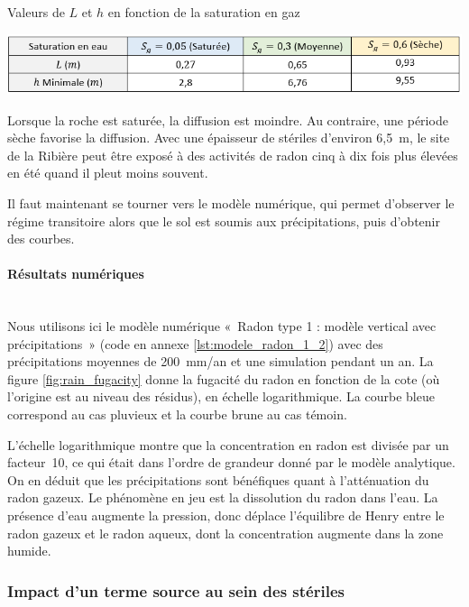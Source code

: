 \documentclass{article}
\begin{document}
\begin{table}[H]
    \centering
    \caption{Valeurs de $L$ et $h$ en fonction de la saturation en gaz}
    \includegraphics[width = \linewidth]{III_C_4.png}

    \label{tab:tableau_saturation}
\end{table}

Lorsque la roche est saturée, la diffusion est moindre. Au contraire, une période sèche favorise la diffusion. Avec une épaisseur de stériles d'environ 6,5~m, le site de la Ribière peut être exposé à des activités de radon cinq à dix fois plus élevées en été quand il pleut moins souvent.

Il faut maintenant se tourner vers le modèle numérique, qui permet d’observer le régime transitoire alors que le sol est soumis aux précipitations, puis d'obtenir des courbes.

\paragraph{Résultats numériques \\ \\}
Nous utilisons ici le modèle numérique « Radon type 1 : modèle vertical avec précipitations » (code en annexe \ref{lst:modele_radon_1_2}) avec des précipitations moyennes de 200~mm/an et une simulation pendant un an. La figure \ref{fig:rain_fugacity} donne la fugacité du radon en fonction de la cote (où l'origine est au niveau des résidus), en échelle logarithmique. La courbe bleue correspond au cas pluvieux et la courbe brune au cas témoin.

L’échelle logarithmique montre que la concentration en radon est divisée par un facteur~10, ce qui était dans l'ordre de grandeur donné par le modèle analytique. On en déduit que les précipitations sont bénéfiques quant à l’atténuation du radon gazeux. Le phénomène en jeu est la dissolution du radon dans l’eau. La présence d’eau augmente la pression, donc déplace l’équilibre de Henry entre le radon gazeux et le radon aqueux, dont la concentration augmente dans la zone humide.

\newpage
\subsubsection{Impact d'un terme source au sein des stériles}
\end{document}
